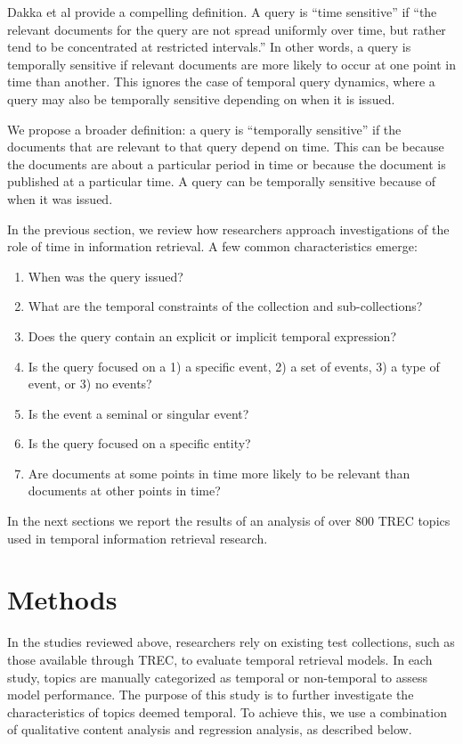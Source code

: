 \documentclass{sig-alternate}
\begin{document}
Dakka et al provide a compelling definition.  A query is ``time sensitive''  if  ``the relevant documents for the query are not spread uniformly over time, but rather tend to be concentrated at restricted intervals.'' In other words, a query is temporally sensitive if relevant documents are more likely to occur at one point in time than another.  This ignores the case of temporal query dynamics,  where a query may also be temporally sensitive depending on when it is issued.

We propose a broader definition: a query is ``temporally sensitive'' if the documents that are relevant to that query depend on time. This can be because the documents are about a particular period in time or because the document is published at a particular time.  A query can be temporally sensitive because of when it was issued.  

In the previous section, we review how researchers approach investigations of the role of time in information retrieval.  A few common characteristics emerge:

\begin{enumerate}
\item When was the query issued?
\item What are the temporal constraints of the collection and sub-collections?
\item Does the query contain an explicit or implicit temporal expression?
\item Is the query focused on a 1) a specific event, 2) a set of events, 3) a type of event, or 3) no events?
\item Is the event a seminal or singular event?
\item Is the query focused on a specific entity?
\item Are documents at some points in time more likely to be relevant than documents at other points in time?
\end{enumerate}

In the next sections we report the results of an analysis of over 800 TREC topics used in temporal information retrieval research. 

\section{Methods}

In the studies reviewed above, researchers rely on existing test collections, such as those available through TREC, to evaluate temporal retrieval models. In each study, topics are manually categorized as temporal or non-temporal to assess model performance.  The purpose of this study is to further investigate the characteristics of topics deemed temporal. To achieve this, we use a combination of qualitative content analysis and regression analysis, as described below.
\end{document}
